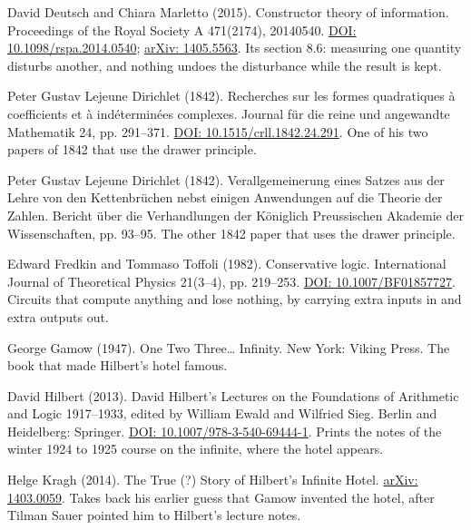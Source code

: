 \noindent David Deutsch and Chiara Marletto (2015). Constructor theory of information. Proceedings of the Royal Society A 471(2174), 20140540. \href{https://doi.org/10.1098/rspa.2014.0540}{DOI: 10.1098/rspa.2014.0540}; \href{https://arxiv.org/abs/1405.5563}{arXiv: 1405.5563}. Its section 8.6: measuring one quantity disturbs another, and nothing undoes the disturbance while the result is kept.
\par\medskip

\noindent Peter Gustav Lejeune Dirichlet (1842). Recherches sur les formes quadratiques \`a coefficients et \`a ind\'etermin\'ees complexes. Journal f\"ur die reine und angewandte Mathematik 24, pp. 291--371. \href{https://doi.org/10.1515/crll.1842.24.291}{DOI: 10.1515/crll.1842.24.291}. One of his two papers of 1842 that use the drawer principle.
\par\medskip

\noindent Peter Gustav Lejeune Dirichlet (1842). Verallgemeinerung eines Satzes aus der Lehre von den Kettenbr\"uchen nebst einigen Anwendungen auf die Theorie der Zahlen. Bericht \"uber die Verhandlungen der K\"oniglich Preussischen Akademie der Wissenschaften, pp. 93--95. The other 1842 paper that uses the drawer principle.
\par\medskip

\noindent Edward Fredkin and Tommaso Toffoli (1982). Conservative logic. International Journal of Theoretical Physics 21(3--4), pp. 219--253. \href{https://doi.org/10.1007/BF01857727}{DOI: 10.1007/BF01857727}. Circuits that compute anything and lose nothing, by carrying extra inputs in and extra outputs out.
\par\medskip

\noindent George Gamow (1947). One Two Three\ldots{} Infinity. New York: Viking Press. The book that made Hilbert's hotel famous.
\par\medskip

\noindent David Hilbert (2013). David Hilbert's Lectures on the Foundations of Arithmetic and Logic 1917--1933, edited by William Ewald and Wilfried Sieg. Berlin and Heidelberg: Springer. \href{https://doi.org/10.1007/978-3-540-69444-1}{DOI: 10.1007/978-3-540-69444-1}. Prints the notes of the winter 1924 to 1925 course on the infinite, where the hotel appears.
\par\medskip

\noindent Helge Kragh (2014). The True (?) Story of Hilbert's Infinite Hotel. \href{https://arxiv.org/abs/1403.0059}{arXiv: 1403.0059}. Takes back his earlier guess that Gamow invented the hotel, after Tilman Sauer pointed him to Hilbert's lecture notes.
\par\medskip

